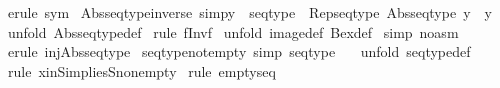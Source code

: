 \begin{isabellebody}
\isamarkupfalse%
\ {\isacharparenleft}erule\ sym{\isacharparenright}\isanewline
{}\isamarkupfalse%
%
\endisatagproof
{\isafoldproof}%
%
\isadelimproof
\isanewline
%
\endisadelimproof
\isanewline
\isanewline
{}\isamarkupfalse%
\ Abs{\isacharunderscore}seqtype{\isacharunderscore}inverse\ {\isacharbrackleft}simp{\isacharbrackright}{\isacharcolon}{\isachardoublequoteopen}y\ {\isacharcolon}\ seqtype\ {\isacharequal}{\isacharequal}{\isachargreater}\ {\isacharparenleft}Rep{\isacharunderscore}seqtype\ {\isacharparenleft}Abs{\isacharunderscore}seqtype\ y{\isacharparenright}{\isacharparenright}\ {\isacharequal}\ y{\isachardoublequoteclose}\isanewline
%
\isadelimproof
%
\endisadelimproof
%
\isatagproof
{}\isamarkupfalse%
\ {\isacharparenleft}unfold\ Abs{\isacharunderscore}seqtype{\isacharunderscore}def{\isacharparenright}\isanewline
{}\isamarkupfalse%
\ {\isacharparenleft}rule\ f{\isacharunderscore}Inv{\isacharunderscore}f{\isacharparenright}\isanewline
{}\isamarkupfalse%
\ {\isacharparenleft}unfold\ image{\isacharunderscore}def\ Bex{\isacharunderscore}def{\isacharparenright}\isanewline
{}\isamarkupfalse%
\ {\isacharparenleft}simp\ {\isacharparenleft}no{\isacharunderscore}asm{\isacharparenright}{\isacharparenright}\isanewline
{}\isamarkupfalse%
\ {\isacharparenleft}erule\ inj{\isacharunderscore}Abs{\isacharunderscore}seqtype{}{\isacharparenright}\isanewline
{}\isamarkupfalse%
%
\endisatagproof
{\isafoldproof}%
%
\isadelimproof
\isanewline
%
\endisadelimproof
\isanewline
\isanewline
\isanewline
{}\isamarkupfalse%
\ seqtype{\isacharunderscore}notempty\ {\isacharbrackleft}simp{\isacharbrackright}{\isacharcolon}\ {\isachardoublequoteopen}seqtype\ {\isachartilde}{\isacharequal}\ {\isacharbraceleft}{\isacharbraceright}{\isachardoublequoteclose}\isanewline
%
\isadelimproof
%
\endisadelimproof
%
\isatagproof
{}\isamarkupfalse%
\ {\isacharparenleft}unfold\ seqtype{\isacharunderscore}def{\isacharparenright}\isanewline
{}\isamarkupfalse%
\ {\isacharparenleft}rule\ x{\isacharunderscore}in{\isacharunderscore}S{\isacharunderscore}implies{\isacharunderscore}S{\isacharunderscore}nonempty{\isacharparenright}\isanewline
{}\isamarkupfalse%
\ {\isacharparenleft}rule\ empty{\isacharunderscore}seq{\isacharparenright}\isanewline
{}\isamarkupfalse%
%
\endisatagproof
{\isafoldproof}%
%
\isadelimproof
\isanewline
%
\endisadelimproof
\isanewline
\isanewline
{}\isamarkupfalse%

\end{isabellebody}
